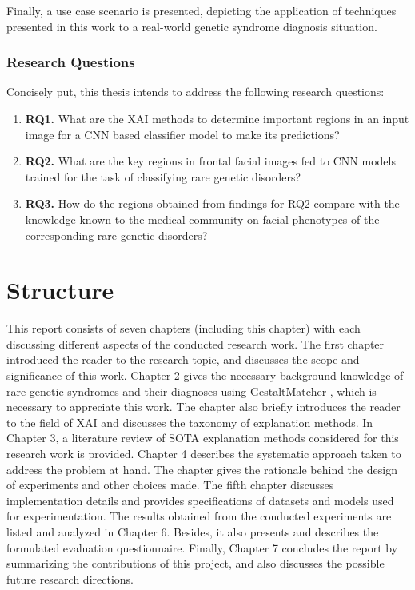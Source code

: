 \documentclass[../report.tex]{subfiles}
\begin{document}
 	Finally, a use case scenario is presented, depicting the application of techniques presented in this work to a real-world genetic syndrome diagnosis situation.
 	
 	 
 	\subsubsection{Research Questions} \label{sec_rq}
 	Concisely put, this thesis intends to address the following research questions:%
 	\begin{enumerate}
 		\item [] \textbf{RQ1.} What are the XAI methods to determine important regions in an input image for a CNN based classifier model to make its predictions?  
 		\item [] \textbf{RQ2.} What are the key regions in frontal facial images fed to CNN models trained for the task of classifying rare genetic disorders?
 		\item [] \textbf{RQ3.} How do the regions obtained from findings for RQ2 compare with the knowledge known to the medical community on facial phenotypes of the corresponding rare genetic disorders? 
 	\end{enumerate}
 
 	\section{Structure}
 	This report consists of seven chapters (including this chapter) with each discussing different aspects of the conducted research work. The first chapter introduced the reader to the research topic, and discusses the scope and significance of this work. Chapter 2 gives the necessary background knowledge of rare genetic syndromes and their diagnoses using GestaltMatcher \cite{hsieh2022gestaltmatcher}, which is necessary to appreciate this work. The chapter also briefly introduces the reader to the field of XAI and discusses the taxonomy of explanation methods. In Chapter 3, a literature review of SOTA explanation methods considered for this research work is provided. Chapter 4 describes the systematic approach taken to address the problem at hand. The chapter gives the rationale behind the design of experiments and other choices made. The fifth chapter discusses implementation details and provides specifications of datasets and models used for experimentation. The results obtained from the conducted experiments are listed and analyzed in Chapter 6. Besides, it also presents and describes the formulated evaluation questionnaire. Finally, Chapter 7 concludes the report by summarizing the contributions of this project, and also discusses the possible future research directions. 
 	
 	
\end{document}
